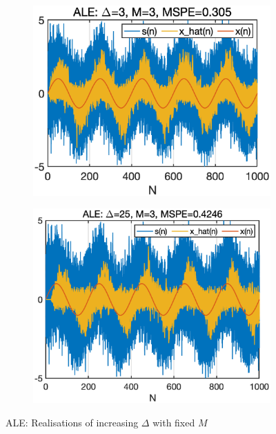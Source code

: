 \begin{figure}[htb]
    \centering
    \hspace{-0.4cm}
    \begin{subfigure}[t]{0.37\textwidth}
     \centering
     \includegraphics[width=\textwidth]{fig/23/23b3.eps}
    \end{subfigure}
    \hspace{0.4cm}
    \begin{subfigure}[t]{0.37\textwidth}
     \centering
     \includegraphics[width=\textwidth]{fig/23/23b4.eps}
    \end{subfigure} 
    \caption{ALE: Realisations of increasing $\Delta$ with fixed $M$}
    \label{fig:2_3_b2}
\end{figure}
